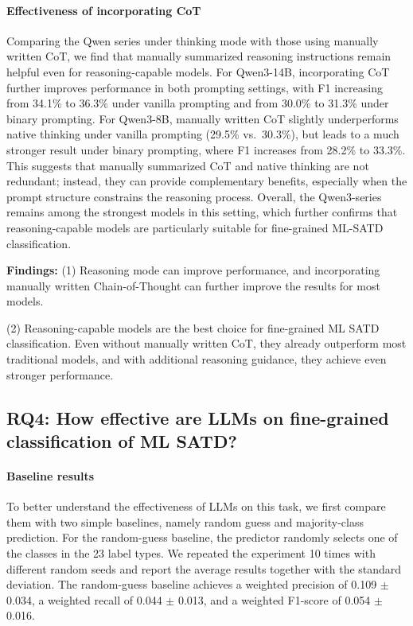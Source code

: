 \documentclass[acmsmall,screen,review,anonymous]{acmart}
\begin{document}
\paragraph{Effectiveness of incorporating CoT}


Comparing the Qwen series under thinking mode with those using manually written CoT, we find that manually summarized reasoning instructions remain helpful even for reasoning-capable models. For Qwen3-14B, incorporating CoT further improves performance in both prompting settings, with F1 increasing from 34.1\% to 36.3\% under vanilla prompting and from 30.0\% to 31.3\% under binary prompting. For Qwen3-8B, manually written CoT slightly underperforms native thinking under vanilla prompting (29.5\% vs.\ 30.3\%), but leads to a much stronger result under binary prompting, where F1 increases from 28.2\% to 33.3\%. This suggests that manually summarized CoT and native thinking are not redundant; instead, they can provide complementary benefits, especially when the prompt structure constrains the reasoning process. Overall, the Qwen3-series remains among the strongest models in this setting, which further confirms that reasoning-capable models are particularly suitable for fine-grained ML-SATD classification.

\begin{boxB}
\textbf{Findings:} 
(1) Reasoning mode can improve performance, and incorporating manually written Chain-of-Thought can further improve the results for most models.

(2) Reasoning-capable models are the best choice for fine-grained ML SATD classification. Even without manually written CoT, they already outperform most traditional models, and with additional reasoning guidance, they achieve even stronger performance.
\end{boxB}



\subsection{RQ4: How effective are LLMs on fine-grained classification of ML SATD?}


\paragraph{Baseline results}

To better understand the effectiveness of LLMs on this task, we first compare them with two simple baselines, namely random guess and majority-class prediction. For the random-guess baseline, the predictor randomly selects one of the classes in the 23 label types. We repeated the experiment 10 times with different random seeds and report the average results together with the standard deviation. The random-guess baseline achieves a weighted precision of 0.109 $\pm$ 0.034, a weighted recall of 0.044 $\pm$ 0.013, and a weighted F1-score of 0.054 $\pm$ 0.016.
\end{document}
